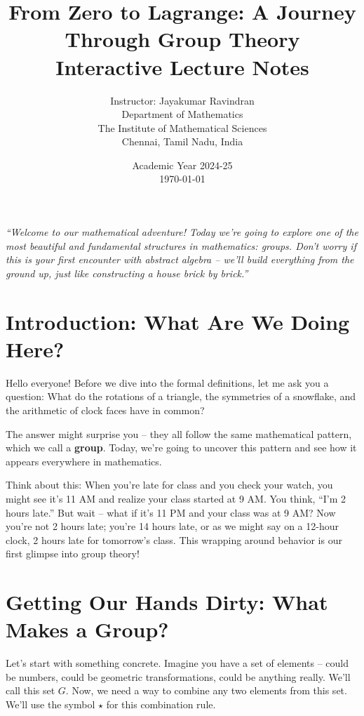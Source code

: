 \documentclass[12pt]{article}
\title{\textcolor{TitleColor}{\LARGE From Zero to Lagrange: A Journey Through Group Theory}\\\large\textcolor{deepmintgreen}{Interactive Lecture Notes}}
\author{Instructor: Jayakumar Ravindran \\ Department of Mathematics \\ The Institute of Mathematical Sciences \\ Chennai, Tamil Nadu, India}
\date{Academic Year 2024-25 \\ \today}
\begin{document}
\pagecolor{softgray}

\maketitle

\begin{center}
\large\textit{\textcolor{richpurple}{``Welcome to our mathematical adventure! Today we're going to explore one of the most beautiful and fundamental structures in mathematics: groups. Don't worry if this is your first encounter with abstract algebra – we'll build everything from the ground up, just like constructing a house brick by brick.''}}
\end{center}

\tableofcontents
\newpage

\section{\textcolor{SectionColor}{Introduction: What Are We Doing Here?}}

Hello everyone! Before we dive into the formal definitions, let me ask you a question: What do the rotations of a triangle, the symmetries of a snowflake, and the arithmetic of clock faces have in common? 

The answer might surprise you – they all follow the same mathematical pattern, which we call a \textbf{\textcolor{KeyTermColor}{group}}. Today, we're going to uncover this pattern and see how it appears everywhere in mathematics.

Think about this: When you're late for class and you check your watch, you might see it's 11 AM and realize your class started at 9 AM. You think, ``I'm 2 hours late.'' But wait – what if it's 11 PM and your class was at 9 AM? Now you're not 2 hours late; you're 14 hours late, or as we might say on a 12-hour clock, 2 hours late for tomorrow's class. This wrapping around behavior is our first glimpse into group theory!

\section{\textcolor{SectionColor}{Getting Our Hands Dirty: What Makes a Group?}}

Let's start with something concrete. Imagine you have a set of elements – could be numbers, could be geometric transformations, could be anything really. We'll call this set $G$. Now, we need a way to combine any two elements from this set. We'll use the symbol $\star$ for this combination rule.
\end{document}
